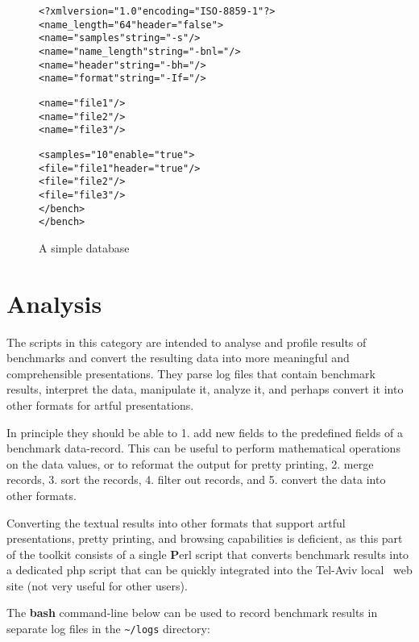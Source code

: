 \begin{figure}[!hbp]
\begin{alltt}
<?xml version="1.0" encoding="ISO-8859-1"?>
<\textbf{} name_length="64" header="false">
  <\textbf{} name="samples" string="-s"/>
  <\textbf{} name="name_length" string="-bnl="/> 
  <\textbf{} name="header" string="-bh="/> 
  <\textbf{} name="format" string="-If="/>

  <\textbf{} name="file1"/>
  <\textbf{} name="file2"/>
  <\textbf{} name="file3"/>

  <\textbf{} samples="10" enable="true">
    <\textbf{} file="file1" header="true"/>
    <\textbf{} file="file2"/>
    <\textbf{} file="file3"/>
  </bench>
</bench>  
\end{alltt}
\caption{A simple database}\label{database}
\end{figure}

\section{Analysis\label{Analysis}}
The scripts in this category are intended to analyse and profile
results of benchmarks and convert the resulting data into more
meaningful and comprehensible presentations. They parse log files that
contain benchmark results, interpret the data, manipulate it, analyze
it, and perhaps convert it into other formats for artful presentations.

In principle they should be able to 1. add new fields to the
predefined fields of a benchmark data-record. This can be useful to
perform mathematical operations on the data values, or to reformat the
output for pretty printing, 2. merge records, 3. sort the records, 
4. filter out records, and 5. convert the data into other formats.

Converting the textual results into other formats that support artful
presentations, pretty printing, and browsing capabilities is
deficient, as this part of the toolkit consists of a single
{\textbf Perl} script that converts benchmark results into a dedicated
php script that can be quickly integrated into the Tel-Aviv local
\cgal\ web site (not very useful for other users).

The \textbf{bash} command-line below can be used to record benchmark
results in separate log files in the {\tt \~{}/logs} directory:
 
